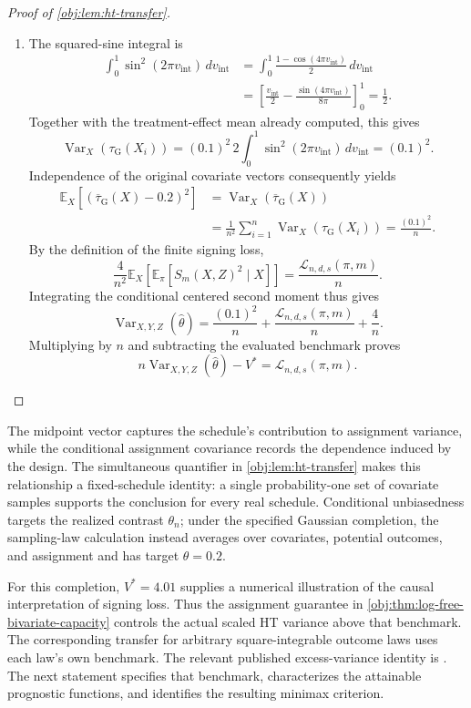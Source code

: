 \documentclass[11pt]{article}
\begin{document}
\begin{proof}[Proof of \cref{obj:lem:ht-transfer}]
\begin{enumerate}
\item
The squared-sine integral is
\[
\begin{aligned}
\int_0^1\sin^2(2\pi v_{\mathrm{int}})\,dv_{\mathrm{int}}
&=
\int_0^1\frac{1-\cos(4\pi v_{\mathrm{int}})}2\,dv_{\mathrm{int}}\\
&=
\left[
\frac{v_{\mathrm{int}}}{2}
-\frac{\sin(4\pi v_{\mathrm{int}})}{8\pi}
\right]_0^1
=\frac12.
\end{aligned}
\]
Together with the treatment-effect mean already computed, this gives
\[
\operatorname{Var}_X(\tau_{\mathrm G}(X_i))
=
(0.1)^2\,2\int_0^1
\sin^2(2\pi v_{\mathrm{int}})\,dv_{\mathrm{int}}
=
(0.1)^2.
\]
Independence of the original covariate vectors consequently yields
\[
\begin{aligned}
\mathbb E_X[
(\overline\tau_{\mathrm G}(X)-0.2)^2]
&=
\operatorname{Var}_X(\overline\tau_{\mathrm G}(X))\\
&=
\frac1{n^2}\sum_{i=1}^n
\operatorname{Var}_X(\tau_{\mathrm G}(X_i))
=
\frac{(0.1)^2}{n}.
\end{aligned}
\]
By the definition of the finite signing loss,
\[
\frac4{n^2}
\mathbb E_X\!\left[
\mathbb E_\pi[S_m(X,Z)^2\mid X]
\right]
=
\frac{\mathcal L_{n,d,s}(\pi,m)}{n}.
\]
Integrating the conditional centered second moment thus gives
\[
\operatorname{Var}_{X,Y,Z}(\widehat\theta)
=
\frac{(0.1)^2}{n}
+\frac{\mathcal L_{n,d,s}(\pi,m)}{n}
+\frac4n.
\]
Multiplying by \(n\) and subtracting the evaluated benchmark proves
\[
n\operatorname{Var}_{X,Y,Z}(\widehat\theta)-V^*
=
\mathcal L_{n,d,s}(\pi,m).
\]
\end{enumerate}
\end{proof}

The midpoint vector  captures the schedule's contribution to assignment variance, while the conditional assignment covariance  records the dependence induced by the design. The simultaneous quantifier in \cref{obj:lem:ht-transfer} makes this relationship a fixed-schedule identity: a single probability-one set of covariate samples supports the conclusion for every real schedule. Conditional unbiasedness targets the realized contrast \(\theta_n\); under the specified Gaussian completion, the sampling-law calculation instead averages over covariates, potential outcomes, and assignment and has target \(\theta=0.2\).

For this completion, \(V^*=4.01\) supplies a numerical illustration of the causal interpretation of signing loss. Thus the assignment guarantee in \cref{obj:thm:log-free-bivariate-capacity} controls the actual scaled HT variance above that benchmark. The corresponding transfer for arbitrary square-integrable outcome laws uses each law's own benchmark. The relevant published excess-variance identity is \citet[Proposition 2.3, equation (2.4), under Assumption 2.1 and Definition 2.2]{Cytrynbaum2026Limits}. The next statement specifies that benchmark, characterizes the attainable prognostic functions, and identifies the resulting minimax criterion.
\end{document}
